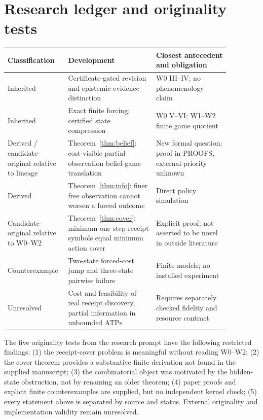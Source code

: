 \documentclass[11pt,letterpaper]{article}
\theoremstyle{definition}
\theoremstyle{remark}
\begin{document}
\section{Research ledger and originality tests}
\small
\begin{longtable}{p{0.19\linewidth}p{0.37\linewidth}p{0.31\linewidth}}
\toprule Classification & Development & Closest antecedent and obligation \\\midrule\endhead
Inherited & Certificate-gated revision and epistemic evidence distinction & W0 III--IV; no phenomenology claim \\
Inherited & Exact finite forcing; certified state compression & W0 V--VI; W1--W2 finite game quotient \\
Derived / candidate-original relative to lineage & Theorem~\ref{thm:belief}: cost-visible partial-observation belief-game translation & New formal question; proof in PROOFS, external-priority unknown \\
Derived & Theorem~\ref{thm:info}: finer free observation cannot worsen a forced outcome & Direct policy simulation \\
Candidate-original relative to W0--W2 & Theorem~\ref{thm:cover}: minimum one-step receipt symbols equal minimum action cover & Explicit proof; not asserted to be novel in outside literature \\
Counterexample & Two-state forced-cost jump and three-state pairwise failure & Finite models; no installed experiment \\
Unresolved & Cost and feasibility of real receipt discovery, partial information in unbounded ATPs & Requires separately checked fidelity and resource contract \\
\bottomrule\end{longtable}
\normalsize

The five originality tests from the research prompt have the following restricted findings: (1) the receipt-cover problem is meaningful without reading W0--W2; (2) the cover theorem provides a substantive finite derivation not found in the supplied manuscript; (3) the combinatorial object was motivated by the hidden-state obstruction, not by renaming an older theorem; (4) paper proofs and explicit finite counterexamples are supplied, but no independent kernel check; (5) every statement above is separated by source and status. External originality and implementation validity remain unresolved.
\end{document}
